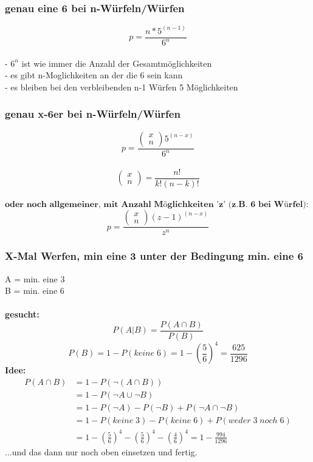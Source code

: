 \documentclass{article}
\begin{document}
\subsubsection{genau eine 6 bei n-W\"urfeln/W\"urfen}
\[ p= \frac{n*5^{(n-1)}}{6^n}\]\\
- $6^n $ ist wie immer die Anzahl der Gesamtm\"oglichkeiten \\
- es gibt n-Moglichkeiten an der die 6 sein kann \\
- es bleiben bei den verbleibenden n-1 W\"urfen 5 M\"oglichkeiten
\subsubsection{genau x-6er bei n-W\"urfeln/W\"urfen}
\[ p= \frac{\begin{pmatrix}
			x\\n
\end{pmatrix}5^{(n-x)}}{6^n}\]\\
\[\begin{pmatrix}
		x\\n
	\end{pmatrix}= \frac{n!}{k!(n-k)!}
\]\\
$\textbf{oder noch allgemeiner, mit Anzahl M\"oglichkeiten 'z' (z.B. 6 bei W\"urfel):}$\[
	p= \frac{\begin{pmatrix}
			x\\n
	\end{pmatrix}(z-1)^{(n-x)}}{z^n}
\]
\subsubsection{X-Mal Werfen, min eine 3 unter der Bedingung min. eine 6}
A = min. eine 3 \\
B = min. eine 6 \\\\
\textbf{gesucht:} \[P(A|B) = \frac{P(A\cap B)}{P(B)} \]
\[P(B) = 1-P(keine\;6) = 1-\left(\frac{5}{6}\right)^4 = \frac{625}{1296}\]
\textbf{Idee:}
\begin{align*}
	P(A\cap B) 	&= 1-P(\neg (A\cap B))\\
							   &= 1-P(\neg A \cup \neg B)\\
							&= 1-P(\neg A) - P(\neg B) + P(\neg A \cap \neg B)\\
						 &= 1-P(keine\;3)-P(keine\;6)+P(weder\;3\;noch\;6)\\
						 &= 1-\left( \frac{5}{6}\right)^4-\left( \frac{5}{6}\right)^4-\left( \frac{4}{6}\right)^4 = 1- \frac{994}{1296}
\end{align*}	
...und das dann nur noch oben einsetzen und fertig.
\end{document}
